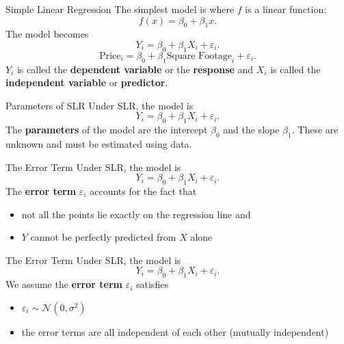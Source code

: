 \documentclass[handout]{beamer}
\begin{document}
\begin{frame}{Simple Linear Regression}
    The simplest model is where $f$ is a linear function:
    \begin{equation*}
        f(x) = \beta_0 + \beta_1 x.
    \end{equation*}
    The model becomes 
    \begin{equation*}
        Y_i = \beta_0 + \beta_1 X_i + \varepsilon_i.
    \end{equation*}
    \begin{equation*}
        \textrm{Price}_i = \beta_0 + \beta_1 \textrm{Square Footage}_i + \varepsilon_i.
    \end{equation*}
    $Y_i$ is called the \textbf{dependent variable} or the \textbf{response} and $X_i$ is called the \textbf{independent variable} or \textbf{predictor}.
\end{frame}

\begin{frame}{Parameters of SLR}
    Under SLR, the model is 
    \begin{equation*}
        Y_i = \beta_0 + \beta_1 X_i + \varepsilon_i.
    \end{equation*}
    The \textbf{parameters} of the model are the intercept $\beta_0$ and the slope $\beta_1$. These are unknown and must be estimated using data.
\end{frame}

\begin{frame}{The Error Term}
    Under SLR, the model is 
    \begin{equation*}
        Y_i = \beta_0 + \beta_1 X_i + \varepsilon_i.
    \end{equation*}
    The \textbf{error term} $\varepsilon_i$ accounts for the fact that 
    \begin{itemize}
        \item not all the points lie exactly on the regression line and
        \item $Y$ cannot be perfectly predicted from $X$ alone
    \end{itemize}
\end{frame}

\begin{frame}{The Error Term}
    Under SLR, the model is 
    \begin{equation*}
        Y_i = \beta_0 + \beta_1 X_i + \varepsilon_i.
    \end{equation*}
    We assume the \textbf{error term} $\varepsilon_i$ satisfies
    \begin{itemize}
        \item $\varepsilon_i \sim \mathcal{N}(0, \sigma^2)$
        \item the error terms are all independent of each other (mutually independent)
    \end{itemize}
\end{frame}
\end{document}
